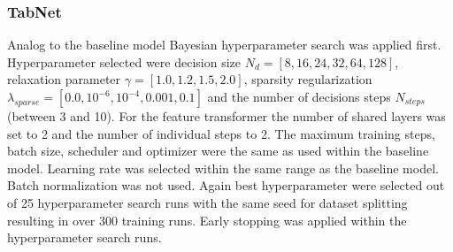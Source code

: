 \documentclass[../main.tex]{subfiles}
\begin{document}
\subsubsection{TabNet} 

Analog to the baseline model Bayesian hyperparameter search was applied first. Hyperparameter selected were decision size $N_d=[8, 16, 24, 32, 64, 128]$, relaxation parameter $\gamma=[1.0, 1.2, 1.5, 2.0]$, sparsity regularization $\lambda_{sparse}=[0.0, 10^{-6}, 10^{-4}, 0.001, 0.1]$ and the number of decisions steps $N_{steps}$ (between 3 and 10). For the feature transformer the number of shared layers was set to 2 and the number of individual steps to 2. The maximum training steps, batch size, scheduler and optimizer were the same as used within the baseline model. Learning rate was selected within the same range as the baseline model. Batch normalization was not used. Again best hyperparameter were selected out of 25 hyperparameter search runs with the same seed for dataset splitting resulting in over 300 training runs. Early stopping was applied within the hyperparameter search runs. 
\end{document}
